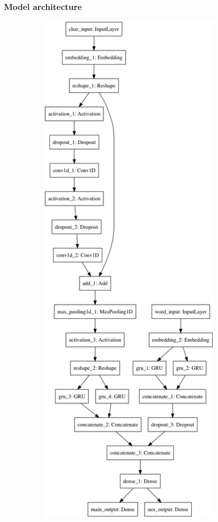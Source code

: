 \subsubsection{Model architecture}
\begin{figure}[H]
    \centering
    \begin{subfigure}[b]{0.3\textwidth}
        \includegraphics[width=\textwidth]{pictures/model_full.png}

\end{subfigure}
\end{figure}
